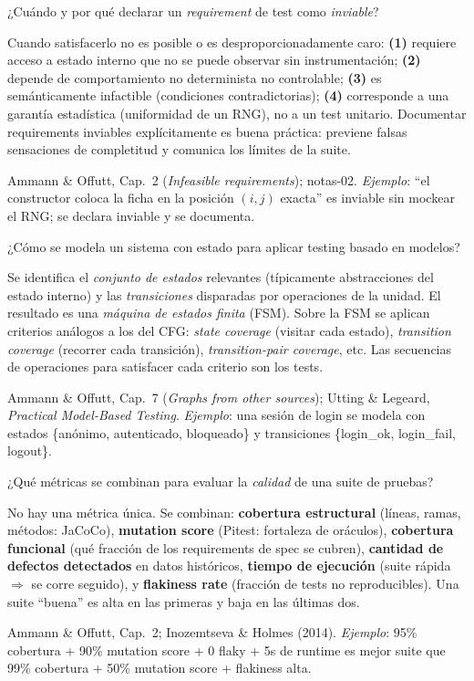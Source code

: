 \documentclass[11pt,a4paper]{article}
\newcounter{preg}
\newcommand{\qa}[3]{%
  \stepcounter{preg}%
  \vspace{0.4em}
  \begin{preguntabox}{\thepreg}
  #1
  \end{preguntabox}
  \begin{respuestabox}
  #2
  \end{respuestabox}
  \begin{refbox}
  #3
  \end{refbox}
  \vspace{0.6em}
}
\begin{document}
\qa{¿Cuándo y por qué declarar un \emph{requirement} de test como \emph{inviable}?}
{Cuando satisfacerlo no es posible o es desproporcionadamente caro: \textbf{(1)} requiere acceso a estado interno que no se puede observar sin instrumentación; \textbf{(2)} depende de comportamiento no determinista no controlable; \textbf{(3)} es semánticamente infactible (condiciones contradictorias); \textbf{(4)} corresponde a una garantía estadística (uniformidad de un RNG), no a un test unitario. Documentar requirements inviables explícitamente es buena práctica: previene falsas sensaciones de completitud y comunica los límites de la suite.}
{Ammann \& Offutt, Cap.~2 (\emph{Infeasible requirements}); notas-02. \emph{Ejemplo}: ``el constructor coloca la ficha en la posición $(i,j)$ exacta'' es inviable sin mockear el RNG; se declara inviable y se documenta.}

\qa{¿Cómo se modela un sistema con estado para aplicar testing basado en modelos?}
{Se identifica el \emph{conjunto de estados} relevantes (típicamente abstracciones del estado interno) y las \emph{transiciones} disparadas por operaciones de la unidad. El resultado es una \emph{máquina de estados finita} (FSM). Sobre la FSM se aplican criterios análogos a los del CFG: \emph{state coverage} (visitar cada estado), \emph{transition coverage} (recorrer cada transición), \emph{transition-pair coverage}, etc. Las secuencias de operaciones para satisfacer cada criterio son los tests.}
{Ammann \& Offutt, Cap.~7 (\emph{Graphs from other sources}); Utting \& Legeard, \emph{Practical Model-Based Testing}. \emph{Ejemplo}: una sesión de login se modela con estados \{anónimo, autenticado, bloqueado\} y transiciones \{login\_ok, login\_fail, logout\}.}

\qa{¿Qué métricas se combinan para evaluar la \emph{calidad} de una suite de pruebas?}
{No hay una métrica única. Se combinan: \textbf{cobertura estructural} (líneas, ramas, métodos: JaCoCo), \textbf{mutation score} (Pitest: fortaleza de oráculos), \textbf{cobertura funcional} (qué fracción de los requirements de spec se cubren), \textbf{cantidad de defectos detectados} en datos históricos, \textbf{tiempo de ejecución} (suite rápida $\Rightarrow$ se corre seguido), y \textbf{flakiness rate} (fracción de tests no reproducibles). Una suite ``buena'' es alta en las primeras y baja en las últimas dos.}
{Ammann \& Offutt, Cap.~2; Inozemtseva \& Holmes (2014). \emph{Ejemplo}: 95\% cobertura + 90\% mutation score + 0 flaky + 5s de runtime es mejor suite que 99\% cobertura + 50\% mutation score + flakiness alta.}
\end{document}
